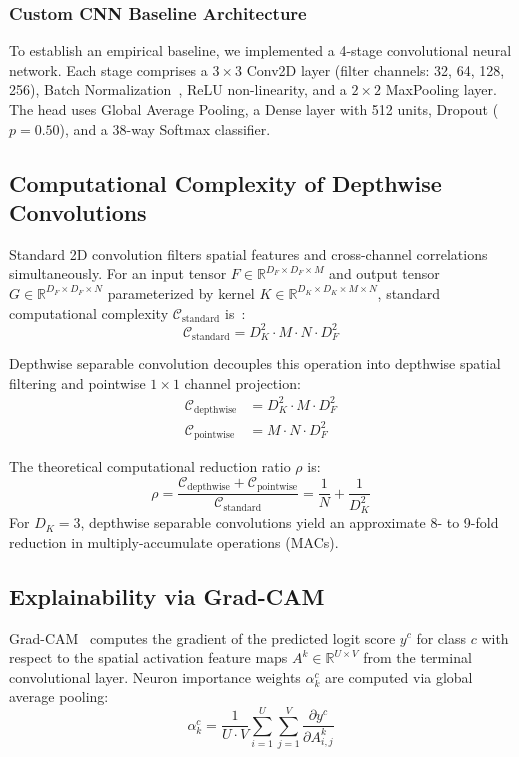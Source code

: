 \documentclass[journal]{IEEEtran}
\begin{document}
\subsubsection{Custom CNN Baseline Architecture}
To establish an empirical baseline, we implemented a 4-stage convolutional neural network. Each stage comprises a $3\times 3$ Conv2D layer (filter channels: 32, 64, 128, 256), Batch Normalization~\cite{ioffe2015}, ReLU non-linearity, and a $2\times 2$ MaxPooling layer. The head uses Global Average Pooling, a Dense layer with 512 units, Dropout ($p=0.50$), and a 38-way Softmax classifier.

\subsection{Computational Complexity of Depthwise Convolutions}
Standard 2D convolution filters spatial features and cross-channel correlations simultaneously. For an input tensor $F \in \mathbb{R}^{D_F \times D_F \times M}$ and output tensor $G \in \mathbb{R}^{D_F \times D_F \times N}$ parameterized by kernel $K \in \mathbb{R}^{D_K \times D_K \times M \times N}$, standard computational complexity $\mathcal{C}_{\text{standard}}$ is~\cite{howard2017}:
\begin{equation}
\mathcal{C}_{\text{standard}} = D_K^2 \cdot M \cdot N \cdot D_F^2
\end{equation}

Depthwise separable convolution decouples this operation into depthwise spatial filtering and pointwise $1\times 1$ channel projection:
\begin{align}
\mathcal{C}_{\text{depthwise}} &= D_K^2 \cdot M \cdot D_F^2 \\
\mathcal{C}_{\text{pointwise}} &= M \cdot N \cdot D_F^2
\end{align}

The theoretical computational reduction ratio $\rho$ is:
\begin{equation}
\rho = \frac{\mathcal{C}_{\text{depthwise}} + \mathcal{C}_{\text{pointwise}}}{\mathcal{C}_{\text{standard}}} = \frac{1}{N} + \frac{1}{D_K^2}
\end{equation}
For $D_K = 3$, depthwise separable convolutions yield an approximate 8- to 9-fold reduction in multiply-accumulate operations (MACs).

\subsection{Explainability via Grad-CAM}
Grad-CAM~\cite{selvaraju2017} computes the gradient of the predicted logit score $y^c$ for class $c$ with respect to the spatial activation feature maps $A^k \in \mathbb{R}^{U \times V}$ from the terminal convolutional layer. Neuron importance weights $\alpha_k^c$ are computed via global average pooling:
\begin{equation}
\alpha_k^c = \frac{1}{U \cdot V} \sum_{i=1}^{U} \sum_{j=1}^{V} \frac{\partial y^c}{\partial A_{i,j}^k}
\end{equation}
\end{document}
